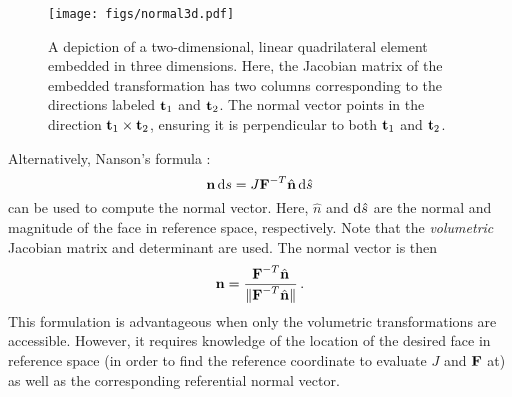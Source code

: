 \documentclass[../doc.tex]{subfiles}
\begin{document}
\begin{figure}
\centering
\texttt{[image: figs/normal3d.pdf]}
\caption{A depiction of a two-dimensional, linear quadrilateral element embedded in three dimensions. Here, the Jacobian matrix of the embedded transformation has two columns corresponding to the directions labeled $\boldsymbol{\mathrm{t}}_1$ and $\boldsymbol{\mathrm{t}}_2$. The normal vector points in the direction $\boldsymbol{\mathrm{t}}_1 \times \boldsymbol{\mathrm{t}}_2$, ensuring it is perpendicular to both $\boldsymbol{\mathrm{t}}_1$ and $\boldsymbol{\mathrm{t}}_2$. }
\label{fem:normal_diag3d}
\end{figure}

Alternatively, Nanson's formula \cite{ciarlet_elasticity,oden1971finite}: 
	\begin{equation}
		\boldsymbol{\mathrm{n}} \mathop{}\!\mathrm{d} s = J \boldsymbol{\mathrm{F}}^{-T} \hat{\boldsymbol{\mathrm{n}}} \mathop{}\!\mathrm{d} \hat{s} 
	\end{equation}
can be used to compute the normal vector. Here, $\hat{n}$ and $\mathop{}\!\mathrm{d} \hat{s}$ are the normal and magnitude of the face in reference space, respectively. Note that the \emph{volumetric} Jacobian matrix and determinant are used. The normal vector is then 
	\begin{equation}
		\boldsymbol{\mathrm{n}} = \frac{\boldsymbol{\mathrm{F}}^{-T} \hat{\boldsymbol{\mathrm{n}}}}{\| \boldsymbol{\mathrm{F}}^{-T} \hat{\boldsymbol{\mathrm{n}}}\|} \,. 
	\end{equation}
This formulation is advantageous when only the volumetric transformations are accessible. However, it requires knowledge of the location of the desired face in reference space (in order to find the reference coordinate to evaluate $J$ and $\boldsymbol{\mathrm{F}}$ at) as well as the corresponding referential normal vector. 
\end{document}
